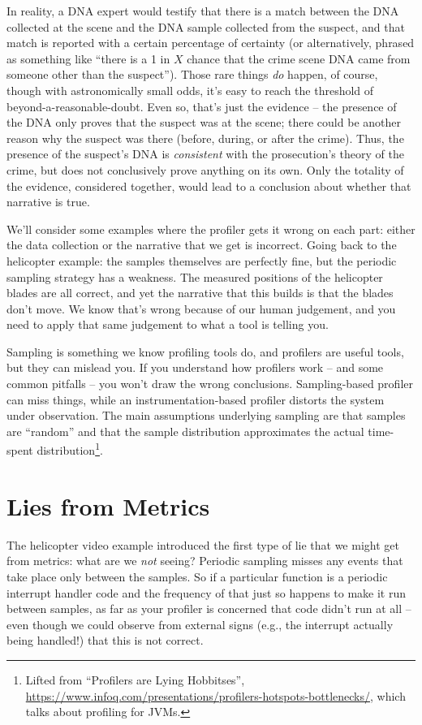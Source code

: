 In reality, a DNA expert would testify that there is a match between the DNA collected at the scene and the DNA sample collected from the suspect, and that match is reported with a certain percentage of certainty (or alternatively, phrased as something like ``there is a 1 in $X$ chance that the crime scene DNA came from someone other than the suspect''). Those rare things \textit{do} happen, of course, though with astronomically small odds, it's easy to reach the threshold of beyond-a-reasonable-doubt. Even so, that's just the evidence -- the presence of the DNA only proves that the suspect was at the scene; there could be another reason why the suspect was there (before, during, or after the crime). Thus, the presence of the suspect's DNA is \textit{consistent} with the prosecution's theory of the crime, but does not conclusively prove anything on its own. Only the totality of the evidence, considered together, would lead to a conclusion about whether that narrative is true.

We'll consider some examples where the profiler gets it wrong on each part: either the data collection or the narrative that we get is incorrect. Going back to the helicopter example: the samples themselves are perfectly fine, but the periodic sampling strategy has a weakness. The measured positions of the helicopter blades are all correct, and yet the narrative that this builds is that the blades don't move. We know that's wrong because of our human judgement, and you need to apply that same judgement to what a tool is telling you.

Sampling is something we know profiling tools do, and profilers
are useful tools, but they can mislead you.  If you understand how
profilers work -- and some common pitfalls -- you won't draw the wrong conclusions. Sampling-based profiler can miss things, while an instrumentation-based profiler distorts the system under observation. The main assumptions underlying sampling are that samples are ``random'' and that the sample distribution approximates the actual time-spent distribution\footnote{Lifted from ``Profilers are Lying Hobbitses'', \url{https://www.infoq.com/presentations/profilers-hotspots-bottlenecks/}, which talks about profiling for JVMs.}.

\section*{Lies from Metrics}
The helicopter video example introduced the first type of lie that we might get from metrics: what are we \textit{not} seeing? Periodic sampling misses any events that take place only between the samples. So if a particular function is a periodic interrupt handler code and the frequency of that just so happens to make it run between samples, as far as your profiler is concerned that code didn't run at all -- even though we could observe from external signs (e.g., the interrupt actually being handled!) that this is not correct.


